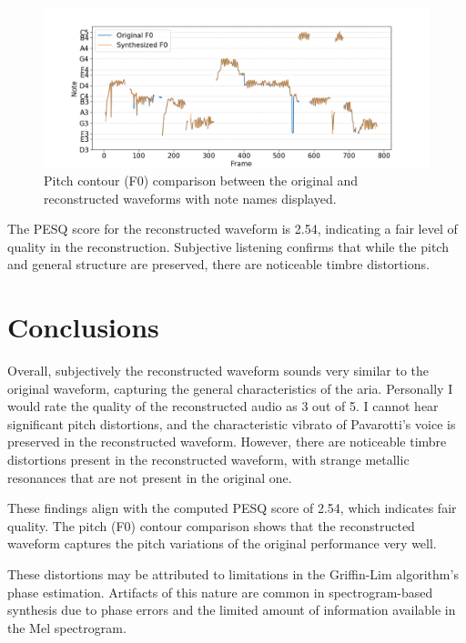 \documentclass{article}
\begin{document}
\begin{figure}[!htbp]
    \centering
    \includegraphics[width=\textwidth]{data/plots/nessun_dorma_trimmed_f0_contour_notes.png}
    \caption{Pitch contour (F0) comparison between the original and reconstructed waveforms with note names displayed.}
    \label{fig:f0_contour_notes}
\end{figure}

The PESQ score for the reconstructed waveform is 2.54, indicating a fair level of quality in the reconstruction. Subjective listening confirms that while the pitch and general structure are preserved, there are noticeable timbre distortions.

\section{Conclusions}

Overall, subjectively the reconstructed waveform sounds very similar to the original waveform, capturing the general characteristics of the aria. Personally I would rate the quality of the reconstructed audio as 3 out of 5. I cannot hear significant pitch distortions, and the characteristic vibrato of Pavarotti's voice is preserved in the reconstructed waveform. However, there are noticeable timbre distortions present in the reconstructed waveform, with strange metallic resonances that are not present in the original one.

These findings align with the computed PESQ score of 2.54, which indicates fair quality. The pitch (F0) contour comparison shows that the reconstructed waveform captures the pitch variations of the original performance very well.

These distortions may be attributed to limitations in the Griffin-Lim algorithm's phase estimation. Artifacts of this nature are common in spectrogram-based synthesis due to phase errors and the limited amount of information available in the Mel spectrogram.
\end{document}
